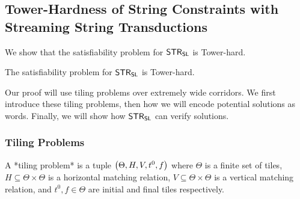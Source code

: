 
\newcommand\scon{S}
\newcommand\svar{x}
\newcommand\alphabet{\Sigma}

\newcommand\rebrac[1]{\left[#1\right]}
\newcommand\fbrac[1]{\left\langle#1\right\rangle}

\newcommand\idxi{i}
\newcommand\idxj{j}
\newcommand\idxk{k}
\newcommand\numof{n}

\newcommand\tiles{\Theta}
\newcommand\nontiles{\overline{\Theta}}
\newcommand\hrel{H}
\newcommand\vrel{V}
\newcommand\inittile{\tile^0}
\newcommand\fintile{f}
\newcommand\tile{t}
\newcommand\vartile{d}
\newcommand\linlen{\numof}
\newcommand\tileheight{h}
\newcommand\expheight{m}
\newcommand\spacer{\#}
\newcommand\isnum[2]{R^{#2}_{#1}}
\newcommand\lmark{\langle}
\newcommand\rmark{\rangle}
\newcommand\sftrue[1]{\top_{#1}}
\newcommand\sffalse[1]{\bot_{#1}}
\newcommand\sfvalue{v}

\newcommand\tilesnum[1]{\tiles_{#1}}
\newcommand\hrelnum[1]{\hrel_{#1}}
\newcommand\vrelnum[1]{\vrel_{#1}}
\newcommand\inittilenum[1]{\inittile_{#1}}
\newcommand\fintilenum[1]{\fintile_{#1}}
\newcommand\nmax[1]{N_{#1}}
\newcommand\tenc[2]{[#2]_{#1}}

\newcommand\fullrow[1]{
    \tenc{\expheight}{1} \tile^{#1}_1
        \ldots
        \tenc{\expheight}{\nmax{\expheight}}
            \tile^{#1}_{\nmax{\expheight}}
}

\subsection{Tower-Hardness of String Constraints with Streaming String Transductions}
\label{sec:tower-hard}

We show that the satisfiability problem for $\mathsf{STR}_{\mathsf{SL}}$ is Tower-hard.

\begin{theorem}
The satisfiability problem for $\mathsf{STR}_{\mathsf{SL}}$ is Tower-hard.
\end{theorem}

Our proof will use tiling problems over extremely wide corridors.
We first introduce these tiling problems, then how we will encode potential solutions as words.
Finally, we will show how $\mathsf{STR}_{\mathsf{SL}}$ can verify solutions.

\subsubsection{Tiling Problems}

A *tiling problem* is a tuple
$\tup{\tiles, \hrel, \vrel, \inittile, \fintile}$
where
    $\tiles$ is a finite set of tiles,
    $\hrel \subseteq \tiles \times \tiles$ is a horizontal matching relation,
    $\vrel \subseteq \tiles \times \tiles$ is a vertical matching relation, and
    $\inittile, \fintile \in \tiles$ are initial and final tiles respectively.

